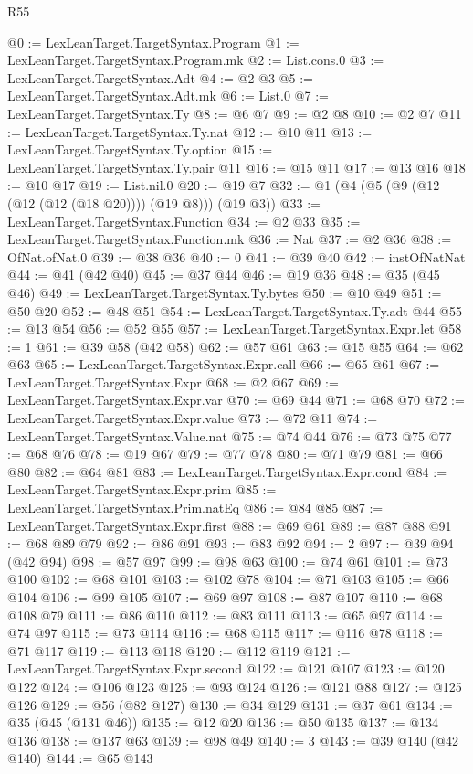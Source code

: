 \begin{lexlean}{R55}
\begin{coremodule}
@0 := LexLeanTarget.TargetSyntax.Program
@1 := LexLeanTarget.TargetSyntax.Program.mk
@2 := List.cons.{0}
@3 := LexLeanTarget.TargetSyntax.Adt
@4 := @2 @3
@5 := LexLeanTarget.TargetSyntax.Adt.mk
@6 := List.{0}
@7 := LexLeanTarget.TargetSyntax.Ty
@8 := @6 @7
@9 := @2 @8
@10 := @2 @7
@11 := LexLeanTarget.TargetSyntax.Ty.nat
@12 := @10 @11
@13 := LexLeanTarget.TargetSyntax.Ty.option
@15 := LexLeanTarget.TargetSyntax.Ty.pair @11
@16 := @15 @11
@17 := @13 @16
@18 := @10 @17
@19 := List.nil.{0}
@20 := @19 @7
@32 := @1 (@4 (@5 (@9 (@12 (@12 (@12 (@18 @20)))) (@19 @8))) (@19 @3))
@33 := LexLeanTarget.TargetSyntax.Function
@34 := @2 @33
@35 := LexLeanTarget.TargetSyntax.Function.mk
@36 := Nat
@37 := @2 @36
@38 := OfNat.ofNat.{0}
@39 := @38 @36
@40 := 0
@41 := @39 @40
@42 := instOfNatNat
@44 := @41 (@42 @40)
@45 := @37 @44
@46 := @19 @36
@48 := @35 (@45 @46)
@49 := LexLeanTarget.TargetSyntax.Ty.bytes
@50 := @10 @49
@51 := @50 @20
@52 := @48 @51
@54 := LexLeanTarget.TargetSyntax.Ty.adt @44
@55 := @13 @54
@56 := @52 @55
@57 := LexLeanTarget.TargetSyntax.Expr.let
@58 := 1
@61 := @39 @58 (@42 @58)
@62 := @57 @61
@63 := @15 @55
@64 := @62 @63
@65 := LexLeanTarget.TargetSyntax.Expr.call
@66 := @65 @61
@67 := LexLeanTarget.TargetSyntax.Expr
@68 := @2 @67
@69 := LexLeanTarget.TargetSyntax.Expr.var
@70 := @69 @44
@71 := @68 @70
@72 := LexLeanTarget.TargetSyntax.Expr.value
@73 := @72 @11
@74 := LexLeanTarget.TargetSyntax.Value.nat
@75 := @74 @44
@76 := @73 @75
@77 := @68 @76
@78 := @19 @67
@79 := @77 @78
@80 := @71 @79
@81 := @66 @80
@82 := @64 @81
@83 := LexLeanTarget.TargetSyntax.Expr.cond
@84 := LexLeanTarget.TargetSyntax.Expr.prim
@85 := LexLeanTarget.TargetSyntax.Prim.natEq
@86 := @84 @85
@87 := LexLeanTarget.TargetSyntax.Expr.first
@88 := @69 @61
@89 := @87 @88
@91 := @68 @89 @79
@92 := @86 @91
@93 := @83 @92
@94 := 2
@97 := @39 @94 (@42 @94)
@98 := @57 @97
@99 := @98 @63
@100 := @74 @61
@101 := @73 @100
@102 := @68 @101
@103 := @102 @78
@104 := @71 @103
@105 := @66 @104
@106 := @99 @105
@107 := @69 @97
@108 := @87 @107
@110 := @68 @108 @79
@111 := @86 @110
@112 := @83 @111
@113 := @65 @97
@114 := @74 @97
@115 := @73 @114
@116 := @68 @115
@117 := @116 @78
@118 := @71 @117
@119 := @113 @118
@120 := @112 @119
@121 := LexLeanTarget.TargetSyntax.Expr.second
@122 := @121 @107
@123 := @120 @122
@124 := @106 @123
@125 := @93 @124
@126 := @121 @88
@127 := @125 @126
@129 := @56 (@82 @127)
@130 := @34 @129
@131 := @37 @61
@134 := @35 (@45 (@131 @46))
@135 := @12 @20
@136 := @50 @135
@137 := @134 @136
@138 := @137 @63
@139 := @98 @49
@140 := 3
@143 := @39 @140 (@42 @140)
@144 := @65 @143

\end{coremodule}
\end{lexlean}
